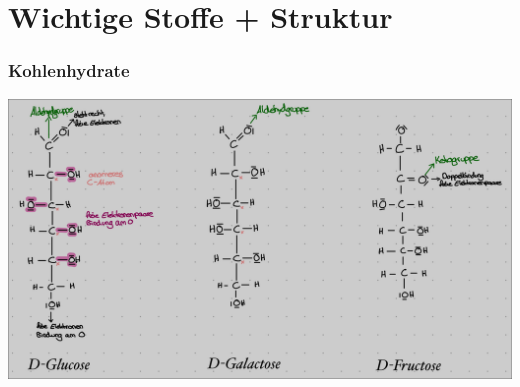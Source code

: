 \section{Wichtige Stoffe + Struktur}
\subsubsection{Kohlenhydrate}
\includegraphics[scale=0.31]{media/naturstoffe/stoffe.png}

